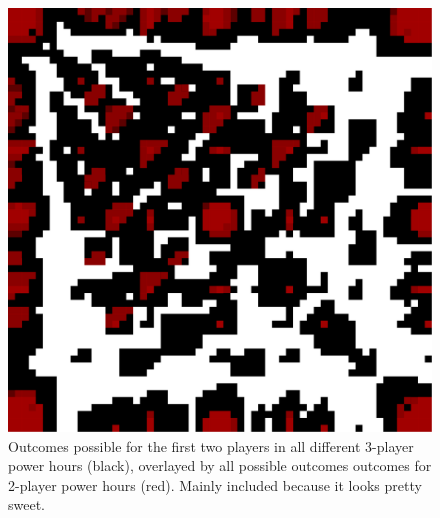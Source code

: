 \documentclass[twocolumn]{article}
\begin{document}



\begin{figure}
\begin{center}
\includegraphics[width=0.90 \linewidth]{3and2.pdf}
\end{center}\vspace{-0.1in}
\caption{Outcomes possible for the first two players in all different
  3-player power hours (black), overlayed by all possible outcomes
  outcomes for 2-player power hours (red). Mainly included because
  it looks pretty sweet.
}
\label{fig:3and2}
\end{figure}
\end{document}
